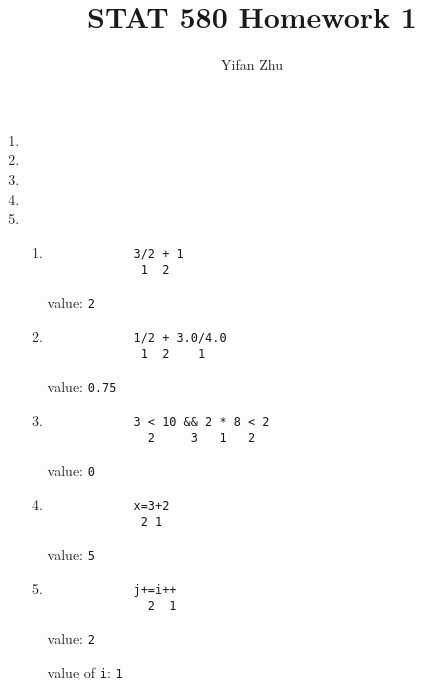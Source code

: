 \documentclass{article}
\begin{document}
	

	
	\title{STAT 580 Homework 1}
	\author{Yifan Zhu}
	\maketitle
	
	\begin{enumerate}[leftmargin = 0 em, label = \arabic*., font = \bfseries]
	\item 
	

	\item 
	

	\newpage
	\item 
	

	\item 
	

	\newpage
	\item 
	\begin{enumerate}
		\item 
		\begin{verbatim}
			3/2 + 1
			 1  2
		\end{verbatim}
		value: \verb|2|

		\item 
		\begin{verbatim}
			1/2 + 3.0/4.0
			 1  2    1
		\end{verbatim}
		value: \verb|0.75|

		\item 
		\begin{verbatim}
			3 < 10 && 2 * 8 < 2
			  2     3   1   2
		\end{verbatim}

		value: \verb|0|
		\item 
		\begin{verbatim}
			x=3+2
			 2 1
		\end{verbatim}
		value: \verb|5|

		\item 
		\begin{verbatim}
			j+=i++
			  2  1
		\end{verbatim}
		value: \verb|2|

		value of \verb|i|: \verb|1|
	
\end{enumerate}

 	\end{enumerate}


	
	
	
	
\end{document}
